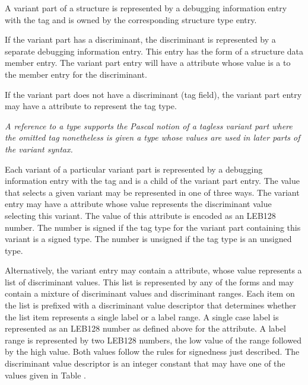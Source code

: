 {A variant part of a structure is represented by a debugging
information entry with the 
tag \DWTAGvariantpartTARG{} and is
owned by the corresponding structure type entry.

If the variant part has a discriminant, the discriminant 
is\hypertarget{chap:DWATdiscrdiscriminantofvariantpart}{}
represented by a 
separate debugging information entry.
\db
This entry has the form
of a 
structure data member entry. The variant part entry will
have a \DWATdiscrDEFN{} attribute 
whose value is a  to
the member entry for the discriminant.

If the variant part does not have a discriminant (tag field),
the variant part entry 
\bb
may have
\eb
{}
a \DWATtype{} attribute to represent the tag type.

\bb
\textit{A reference to a type supports the Pascal notion of a 
tagless variant part where the omitted tag nonetheless is given 
a type whose values are used in later parts of the variant syntax.}
\eb

Each variant of a particular variant part is represented 
by\hypertarget{chap:DWATdiscrvaluediscriminantvalue}{}
a debugging information entry with the 
tag \DWTAGvariantTARG{}
and is a child of the variant part entry. The value that
selects a given variant may be represented in one of three
ways. The variant entry may have a \DWATdiscrvalueDEFN{} 
attribute
whose value represents the discriminant value selecting 
this variant. The value of this
attribute is encoded as an LEB128 number. The number is signed
if the tag type for the variant part containing this variant
is a signed type. The number is unsigned if the tag type is
an unsigned type.

Alternatively,\hypertarget{chap:DWATdiscrlistlistofdiscriminantvalues}{}
the variant entry may contain a
\DWATdiscrlistDEFN{}
attribute, whose value represents a list of discriminant
values. This list is represented by any of the 
 forms and may contain a 
mixture of discriminant values and discriminant ranges. 
Each item on the list is prefixed with a discriminant value
descriptor that determines whether the list item represents
a single label or a label range. A single case label is
represented as an LEB128 number as defined above for the
\DWATdiscrvalue{} 
attribute. A label range is represented by
two LEB128 numbers, the low value of the range followed by the
high value. Both values follow the rules for signedness just
described. The discriminant value descriptor is an integer
constant that may have one of the values given in 
Table .

}

